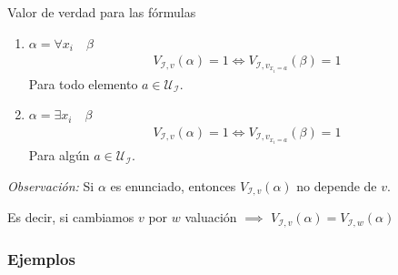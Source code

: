 \begin{definicion}{Valor de verdad para las fórmulas}{}
\begin{enumerate}
    \item $\alpha = \forall x_i \quad \beta$
        \begin{gather*}
            V_{\mathcal{I}, v}(\alpha) = 1 \iff
            V_{\mathcal{I}, v_{x_i=a}}(\beta) = 1
        \end{gather*}
        Para todo elemento $a \in \mathcal{U}_{\mathcal{I}}$.
    \item $\alpha = \exists x_i \quad \beta$
        \begin{gather*}
            V_{\mathcal{I}, v}(\alpha) = 1 \iff
            V_{\mathcal{I}, v_{x_i=a}}(\beta) = 1
        \end{gather*}
        Para algún $a \in \mathcal{U}_{\mathcal{I}}$.
\end{enumerate}     
\end{definicion}

\bigskip
\textit{Observación:}
Si $\alpha$ es enunciado, entonces $V_{\mathcal{I}, v}(\alpha)$ no depende
de $v$.

Es decir, si cambiamos $v$ por $w$ valuación $\implies$ 
%
$V_{\mathcal{I}, v}(\alpha) = V_{\mathcal{I}, w}(\alpha)$

\subsubsection{Ejemplos}

